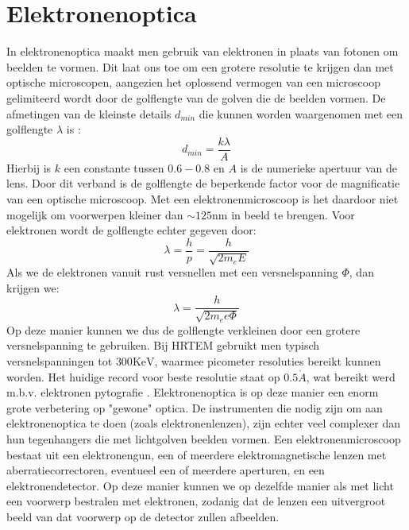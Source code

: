 \documentclass[we,twoside,openright,a4paper,11pt]{uantwerpenbamathesis}
\begin{document}
\section{Elektronenoptica}
In elektronenoptica maakt men gebruik van elektronen in plaats van fotonen om beelden te vormen. Dit laat ons toe om een grotere resolutie te krijgen dan met optische microscopen, aangezien het oplossend vermogen van een microscoop gelimiteerd wordt door de golflengte van de golven die de beelden vormen. De afmetingen van de kleinste details $d_{min}$ die kunnen worden waargenomen met een golflengte $\lambda$ is \cite{PWHawkes}:
\begin{equation}\label{eq:d_min}
    d_{min}=\frac{k\lambda}{A}
\end{equation}
Hierbij is $k$ een constante tussen $0.6-0.8$ en $A$ is de numerieke apertuur van de lens. Door dit verband is de golflengte de beperkende factor voor de magnificatie van een optische microscoop. Met een elektronenmicroscoop is het daardoor niet mogelijk om voorwerpen kleiner dan $\sim125\mathrm{nm}$ in beeld te brengen. Voor elektronen wordt de golflengte echter gegeven door:
\begin{equation}
    \lambda=\frac{h}{p}=\frac{h}{\sqrt{2m_e E}}
\end{equation}
Als we de elektronen vanuit rust versnellen met een versnelspanning $\Phi$, dan krijgen we:
\begin{equation}
    \lambda=\frac{h}{\sqrt{2m_e e\Phi}}
\end{equation}
Op deze manier kunnen we dus de golflengte verkleinen door een grotere versnelspanning te gebruiken. Bij HRTEM gebruikt men typisch versnelspanningen tot $300\mathrm{KeV}$, waarmee picometer resoluties bereikt kunnen worden. Het huidige record voor beste resolutie staat op $0.5\mathring{A}$, wat bereikt werd m.b.v. elektronen pytografie \cite{Jiang2018Ptychography}. Elektronenoptica is op deze manier een enorm grote verbetering op "gewone" optica. De instrumenten die nodig zijn om aan elektronenoptica te doen (zoals elektronenlenzen), zijn echter veel complexer dan hun tegenhangers die met lichtgolven beelden vormen. Een elektronenmicroscoop bestaat uit een elektronengun, een of meerdere elektromagnetische lenzen met aberratiecorrectoren, eventueel een of meerdere aperturen, en een elektronendetector. Op deze manier kunnen we op dezelfde manier als met licht een voorwerp bestralen met elektronen, zodanig dat de lenzen een uitvergroot beeld van dat voorwerp op de detector zullen afbeelden.
\end{document}
